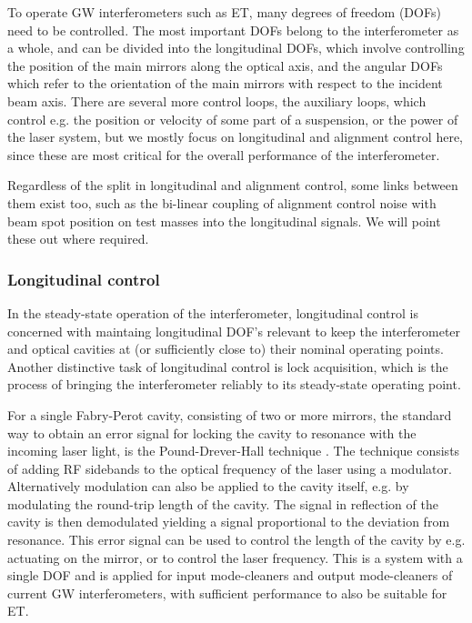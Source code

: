 


To operate GW interferometers such as ET, many degrees of freedom (DOFs) need to be controlled. 
The most important DOFs belong to the interferometer as a whole, and can be divided into the longitudinal DOFs, which involve controlling the position of the main mirrors along the optical axis, and the angular DOFs which refer to the orientation of the main mirrors with respect to the incident beam axis. 
There are several more control loops, the auxiliary loops, which control e.g. the position or velocity of some part of a suspension, or the power of the laser system, but we mostly focus on longitudinal and alignment control here, since these are most critical for the overall performance of the interferometer.

Regardless of the split in longitudinal and alignment control,
some links between them exist too, such as the bi-linear coupling of alignment control noise with
beam spot position on test masses into the longitudinal signals. We will point these out where required.


\subsubsection{Longitudinal control}

In the steady-state operation of the interferometer, longitudinal control is concerned with maintaing longitudinal DOF's relevant to keep the interferometer and optical cavities at (or sufficiently close to) their nominal operating points. Another distinctive task of longitudinal control is lock acquisition, which is the process of bringing the interferometer reliably to its steady-state operating point.

For a single Fabry-Perot cavity, consisting of two or more mirrors, the standard way to obtain an error signal for locking the cavity to resonance with the incoming laser light, is the Pound-Drever-Hall technique \cite{Drever1983}. The technique consists of adding RF sidebands to the optical frequency of the laser using a modulator. Alternatively modulation can also be applied to the cavity itself, e.g. by modulating the round-trip length of the cavity. The signal in reflection of the cavity is then demodulated yielding a signal proportional to the deviation from resonance. This error signal can be used to control the length of the cavity by e.g. actuating on the mirror, or to control the laser frequency. This is a system with a single DOF and is applied for input mode-cleaners and output mode-cleaners of current GW interferometers, with sufficient performance to also be suitable for ET.

